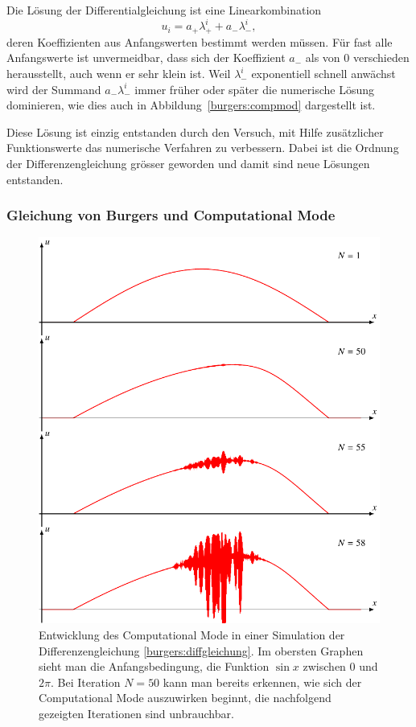 Die Lösung der Differentialgleichung ist eine Linearkombination
\[
u_i = a_+\lambda_+^i + a_-\lambda_-^i,
\]
deren Koeffizienten aus Anfangswerten bestimmt werden müssen.
Für fast alle Anfangswerte ist unvermeidbar, dass sich der
Koeffizient $a_-$ als von $0$ verschieden herausstellt, auch
wenn er sehr klein ist.
Weil $\lambda_-^i$ exponentiell schnell anwächst wird der Summand
$a_-\lambda_-^i$ immer früher oder später die numerische Lösung dominieren,
wie dies auch in Abbildung~\ref{burgers:compmod} dargestellt ist.

Diese Lösung ist einzig entstanden durch den Versuch, mit Hilfe zusätzlicher
Funktionswerte das numerische Verfahren zu verbessern.
Dabei ist die Ordnung der Differenzengleichung grösser geworden und damit
sind neue Lösungen entstanden.

\subsubsection{Gleichung von Burgers und Computational Mode}
\begin{figure}
\centering
\includegraphics{learning/burgerwave.pdf}
\caption{Entwicklung des Computational Mode in einer Simulation
der Differenzengleichung \eqref{burgers:diffgleichung}.
Im obersten Graphen sieht man die Anfangsbedingung, die Funktion $\sin x$
zwischen $0$ und $2\pi$.
Bei Iteration $N=50$ kann man bereits erkennen, wie sich der Computational
Mode auszuwirken beginnt, die nachfolgend gezeigten Iterationen sind
unbrauchbar.
\label{burgers:burgerwave}}
\end{figure}

